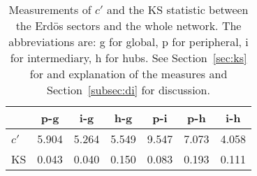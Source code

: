 \begin{table}[h!]
\begin{center}
\begin{tabular}{| l | c | c | c | c | c | c |}\hline
 & p-g & i-g & h-g & p-i & p-h & i-h \\\hline
$c'$ & 5.904  & 5.264  & 5.549  & 9.547  & 7.073  & 4.058 \\\hline
KS & 0.043  & 0.040  & 0.150  & 0.083  & 0.193  & 0.111 \\\hline
\end{tabular}
\caption{Measurements of $c'$ and the KS statistic between the Erd\"os sectors and the whole network. The abbreviations are: g for global, p for peripheral, i for intermediary, h for hubs. See Section~\ref{sec:ks} for and explanation of the measures and Section~\ref{subsec:di} for discussion.}
\end{center}
\end{table}